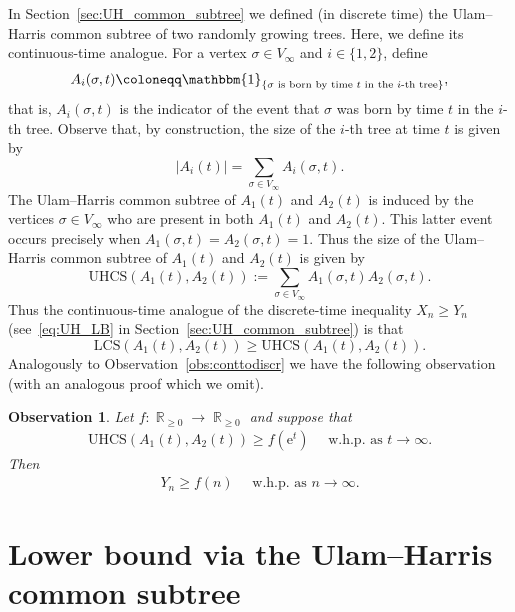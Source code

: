 \documentclass[11pt]{article}
\numberwithin{equation}{section}
\DeclareMathOperator{\R}{\mathbb{R}} %
\newcommand{\LCS}{\mathrm{LCS}} %
\newcommand{\UHCS}{\mathrm{UHCS}} %
\newcommand{\e}{\mathrm e}
\newtheorem{observation}[theorem]{Observation}
\theoremstyle{definition}
\begin{document}
In Section~\ref{sec:UH_common_subtree} we defined (in discrete time) the Ulam--Harris common subtree of two randomly growing trees.  
Here, we define its continuous-time analogue. 
For a vertex $\sigma \in V_\infty$ and $i\in \{1,2\}$, define
\begin{equation}\label{def:ais}
    A_i (\sigma, t) \coloneqq \mathbbm{1}_{\left\{ \sigma \text{ is born by time $t$ in the $i$-th tree} \right\}},
\end{equation}
that is, $A_i (\sigma, t)$ is the indicator of the event that $\sigma$ was born by time $t$ in the $i$-th tree. 
Observe that, by construction, 
the size of the $i$-th tree at time $t$ is given by 
\[
|A_{i}(t)| = \sum_{\sigma \in V_{\infty}} A_{i}(\sigma, t).
\]
The Ulam--Harris common subtree of $A_{1}(t)$ and $A_{2}(t)$ is induced by the vertices $\sigma \in V_{\infty}$ who are present in both $A_{1}(t)$ and $A_{2}(t)$. 
This latter event occurs precisely when 
$A_{1}(\sigma,t) = A_{2}(\sigma,t) = 1$. 
Thus the size of the Ulam--Harris common subtree of $A_{1}(t)$ and $A_{2}(t)$ is given by 
\begin{equation}\label{eq:UHCS_def}
\UHCS(A_{1}(t), A_{2}(t)) 
:= 
\sum_{\sigma \in V_{\infty}} A_{1}(\sigma, t) A_{2}(\sigma, t).
\end{equation}
Thus the continuous-time analogue of the discrete-time inequality $X_{n} \geq Y_{n}$ (see~\eqref{eq:UH_LB} in Section~\ref{sec:UH_common_subtree}) is that 
\begin{equation}\label{eq:UH_LB_continuous_time}
\LCS(A_{1}(t), A_{2}(t)) 
\geq 
\UHCS(A_{1}(t), A_{2}(t)).
\end{equation}
Analogously to Observation~\ref{obs:conttodiscr} 
we have the following observation (with an analogous proof which we omit). 

\begin{observation}\label{obs:UH_conttodiscr}
    Let $f:\R_{\geq 0} \to \R_{\geq 0}$ 
    and suppose that
    \begin{align*}
        \UHCS(A_{1}(t), A_{2}(t)) \geq f(\e^t) \quad \text{ w.h.p. as } t\to \infty. 
    \end{align*}
    Then
    \begin{align*}
        Y_{n} \geq f(n) \quad \text{ w.h.p. as } n \to \infty.
    \end{align*}
\end{observation}

\section{Lower bound via the Ulam--Harris common subtree} \label{sec:UHLB} %
\end{document}
